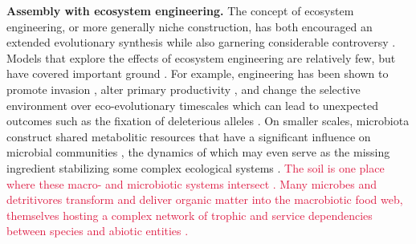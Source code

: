 \documentclass[twocolumn,preprintnumbers,amsmath,amssymb,superscriptaddress,linenumbers]{revtex4-1}
\newcommand{\rev}[1]{\textcolor{crimson}{#1}}
\begin{document}
\vspace{0mm}
\noindent \textbf{Assembly with ecosystem engineering.}
The concept of ecosystem engineering, or more generally niche construction, has both encouraged an extended evolutionary synthesis \cite{Laland2015} while also garnering considerable controversy \cite{Gupta2017,Feldman2017}.
Models that explore the effects of ecosystem engineering are relatively few, but have covered important ground \cite{Hastings2007,OdlingSmee2013}.
For example, engineering has been shown to promote invasion \cite{Cuddington2004}, alter primary productivity \cite{Wright2004}, and change the selective environment over eco-evolutionary timescales \cite{Kylafis2008,Krakauer2009} which can lead to unexpected outcomes such as the fixation of deleterious alleles \cite{Laland1999}.
On smaller scales, microbiota construct shared metabolitic resources that have a significant influence on microbial communities \cite{Kallus2017}, the dynamics of which may even serve as the missing ingredient stabilizing some complex ecological systems \cite{Butler2018}.
\rev{The soil is one place where these macro- and microbiotic systems intersect \cite{Amundson2015}.
Many microbes and detritivores transform and deliver organic matter into the macrobiotic food web, themselves hosting a complex network of trophic and service dependencies between species and abiotic entities \cite{Gutierrez2006,Jouquet2006}.}
\end{document}
